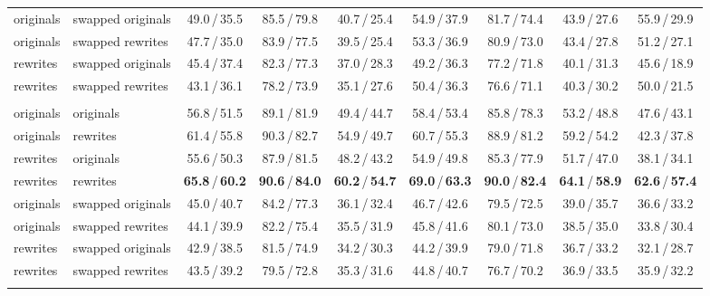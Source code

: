 \begin{table}[t]
\begin{tabular}{@{}llccc@{\hspace{12pt}}cccc@{}}
originals & swapped originals  & 49.0\,/\,35.5 & 85.5\,/\,79.8 & 40.7\,/\,25.4 & 54.9\,/\,37.9 & 81.7\,/\,74.4 & 43.9\,/\,27.6 & 55.9\,/\,29.9 \\
originals & swapped rewrites   & 47.7\,/\,35.0 & 83.9\,/\,77.5 & 39.5\,/\,25.4 & 53.3\,/\,36.9 & 80.9\,/\,73.0 & 43.4\,/\,27.8 & 51.2\,/\,27.1 \\
rewrites  & swapped originals  & 45.4\,/\,37.4 & 82.3\,/\,77.3 & 37.0\,/\,28.3 & 49.2\,/\,36.3 & 77.2\,/\,71.8 & 40.1\,/\,31.3 & 45.6\,/\,18.9 \\
rewrites  & swapped rewrites   & 43.1\,/\,36.1 & 78.2\,/\,73.9 & 35.1\,/\,27.6 & 50.4\,/\,36.3 & 76.6\,/\,71.1 & 40.3\,/\,30.2 & 50.0\,/\,21.5 \\
\addlinespace
\multicolumn{9}{@{}l}{\emph{QuatRoPE (boxes chosen among proposals)}} \\
originals & originals          & 56.8\,/\,51.5 & 89.1\,/\,81.9 & 49.4\,/\,44.7 & 58.4\,/\,53.4 & 85.8\,/\,78.3 & 53.2\,/\,48.8 & 47.6\,/\,43.1 \\
originals & rewrites           & 61.4\,/\,55.8 & 90.3\,/\,82.7 & 54.9\,/\,49.7 & 60.7\,/\,55.3 & 88.9\,/\,81.2 & 59.2\,/\,54.2 & 42.3\,/\,37.8 \\
rewrites  & originals          & 55.6\,/\,50.3 & 87.9\,/\,81.5 & 48.2\,/\,43.2 & 54.9\,/\,49.8 & 85.3\,/\,77.9 & 51.7\,/\,47.0 & 38.1\,/\,34.1 \\
rewrites  & rewrites           & \textbf{65.8}\,/\,\textbf{60.2} & \textbf{90.6}\,/\,\textbf{84.0} & \textbf{60.2}\,/\,\textbf{54.7} & \textbf{69.0}\,/\,\textbf{63.3} & \textbf{90.0}\,/\,\textbf{82.4} & \textbf{64.1}\,/\,\textbf{58.9} & \textbf{62.6}\,/\,\textbf{57.4} \\
originals & swapped originals  & 45.0\,/\,40.7 & 84.2\,/\,77.3 & 36.1\,/\,32.4 & 46.7\,/\,42.6 & 79.5\,/\,72.5 & 39.0\,/\,35.7 & 36.6\,/\,33.2 \\
originals & swapped rewrites   & 44.1\,/\,39.9 & 82.2\,/\,75.4 & 35.5\,/\,31.9 & 45.8\,/\,41.6 & 80.1\,/\,73.0 & 38.5\,/\,35.0 & 33.8\,/\,30.4 \\
rewrites  & swapped originals  & 42.9\,/\,38.5 & 81.5\,/\,74.9 & 34.2\,/\,30.3 & 44.2\,/\,39.9 & 79.0\,/\,71.8 & 36.7\,/\,33.2 & 32.1\,/\,28.7 \\
rewrites  & swapped rewrites   & 43.5\,/\,39.2 & 79.5\,/\,72.8 & 35.3\,/\,31.6 & 44.8\,/\,40.7 & 76.7\,/\,70.2 & 36.9\,/\,33.5 & 35.9\,/\,32.2 \\
\addlinespace
\multicolumn{9}{@{}l}{\emph{3DRS (boxes chosen among proposals)}} \\

\end{tabular}
\end{table}
